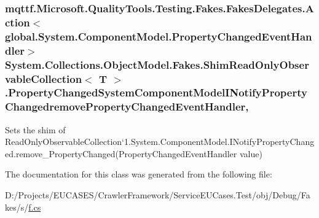 \hypertarget{class_system_1_1_collections_1_1_object_model_1_1_fakes_1_1_shim_read_only_observable_collection_3_01_t_01_4_a77fbcee8d956c664f26c71e84ff146b8}{
\subsubsection[{Property\-Changed\-System\-Component\-Model\-I\-Notify\-Property\-Changedremove\-Property\-Changed\-Event\-Handler}]{\setlength{\rightskip}{0pt plus 5cm}mqttf.\-Microsoft.\-Quality\-Tools.\-Testing.\-Fakes.\-Fakes\-Delegates.\-Action$<$global.\-System.\-Component\-Model.\-Property\-Changed\-Event\-Handler$>$ System.\-Collections.\-Object\-Model.\-Fakes.\-Shim\-Read\-Only\-Observable\-Collection$<$ T $>$.Property\-Changed\-System\-Component\-Model\-I\-Notify\-Property\-Changedremove\-Property\-Changed\-Event\-Handler\hspace{0.3cm}{\ttfamily [set]}, {\ttfamily [remove]}}}\label{class_system_1_1_collections_1_1_object_model_1_1_fakes_1_1_shim_read_only_observable_collection_3_01_t_01_4_a77fbcee8d956c664f26c71e84ff146b8}


Sets the shim of Read\-Only\-Observable\-Collection`1.System.\-Component\-Model.\-I\-Notify\-Property\-Changed.\-remove\-\_\-\-Property\-Changed(\-Property\-Changed\-Event\-Handler value)



The documentation for this class was generated from the following file\-:\begin{DoxyCompactItemize}
\item 
D\-:/\-Projects/\-E\-U\-C\-A\-S\-E\-S/\-Crawler\-Framework/\-Service\-E\-U\-Cases.\-Test/obj/\-Debug/\-Fakes/s/\hyperlink{s_2f_8cs}{f.\-cs}\end{DoxyCompactItemize}
